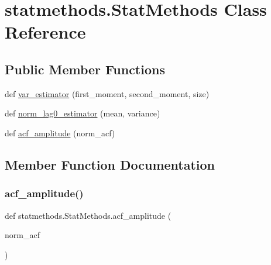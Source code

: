 \hypertarget{classstatmethods_1_1StatMethods}{}\section{statmethods.\+Stat\+Methods Class Reference}
\label{classstatmethods_1_1StatMethods}
\subsection*{Public Member Functions}
\begin{DoxyCompactItemize}
\item 
def \hyperlink{classstatmethods_1_1StatMethods_ae9dd94cc0586ae5ea83ac6cf4a81cb69}{var\+\_\+estimator} (first\+\_\+moment, second\+\_\+moment, size)
\item 
def \hyperlink{classstatmethods_1_1StatMethods_a98bde45d59d8558c9b675b9f5dbd0922}{norm\+\_\+lag0\+\_\+estimator} (mean, variance)
\item 
def \hyperlink{classstatmethods_1_1StatMethods_a7ceddee9254bdb4e664b4d798d67f870}{acf\+\_\+amplitude} (norm\+\_\+acf)
\end{DoxyCompactItemize}


\subsection{Member Function Documentation}
\mbox{\label{classstatmethods_1_1StatMethods_a7ceddee9254bdb4e664b4d798d67f870}} 
\subsubsection{\texorpdfstring{acf\+\_\+amplitude()}{acf\_amplitude()}}
{\footnotesize\ttfamily def statmethods.\+Stat\+Methods.\+acf\+\_\+amplitude (\begin{DoxyParamCaption}\item[{}]{norm\+\_\+acf }\end{DoxyParamCaption})}

\mbox{\label{classstatmethods_1_1StatMethods_a98bde45d59d8558c9b675b9f5dbd0922}} 
